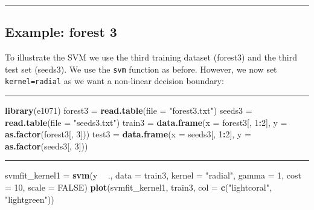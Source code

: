 \documentclass[]{article}
\newenvironment{Shaded}{\begin{snugshade}}{\end{snugshade}}
\newcommand{\DataTypeTok}[1]{\textcolor[rgb]{0.13,0.29,0.53}{#1}}
\newcommand{\DecValTok}[1]{\textcolor[rgb]{0.00,0.00,0.81}{#1}}
\newcommand{\KeywordTok}[1]{\textcolor[rgb]{0.13,0.29,0.53}{\textbf{#1}}}
\newcommand{\NormalTok}[1]{#1}
\newcommand{\OperatorTok}[1]{\textcolor[rgb]{0.81,0.36,0.00}{\textbf{#1}}}
\newcommand{\OtherTok}[1]{\textcolor[rgb]{0.56,0.35,0.01}{#1}}
\newcommand{\StringTok}[1]{\textcolor[rgb]{0.31,0.60,0.02}{#1}}
\begin{document}
\begin{center}\rule{0.5\linewidth}{\linethickness}\end{center}

\hypertarget{example-forest-3}{%
\subsection{Example: forest 3}\label{example-forest-3}}

To illustrate the SVM we use the third training dataset (forest3) and
the third test set (seeds3). We use the \texttt{svm} function as before.
However, we now set
\texttt{kernel=\textquotesingle{}radial\textquotesingle{}} as we want a
non-linear decision boundary:

\begin{center}\rule{0.5\linewidth}{\linethickness}\end{center}

\footnotesize

\begin{Shaded}
\begin{Highlighting}[]
\KeywordTok{library}\NormalTok{(e1071)}
\NormalTok{forest3 =}\StringTok{ }\KeywordTok{read.table}\NormalTok{(}\DataTypeTok{file =} \StringTok{"forest3.txt"}\NormalTok{)}
\NormalTok{seeds3 =}\StringTok{ }\KeywordTok{read.table}\NormalTok{(}\DataTypeTok{file =} \StringTok{"seeds3.txt"}\NormalTok{)}
\NormalTok{train3 =}\StringTok{ }\KeywordTok{data.frame}\NormalTok{(}\DataTypeTok{x =}\NormalTok{ forest3[, }\DecValTok{1}\OperatorTok{:}\DecValTok{2}\NormalTok{], }\DataTypeTok{y =} \KeywordTok{as.factor}\NormalTok{(forest3[, }\DecValTok{3}\NormalTok{]))}
\NormalTok{test3 =}\StringTok{ }\KeywordTok{data.frame}\NormalTok{(}\DataTypeTok{x =}\NormalTok{ seeds3[, }\DecValTok{1}\OperatorTok{:}\DecValTok{2}\NormalTok{], }\DataTypeTok{y =} \KeywordTok{as.factor}\NormalTok{(seeds3[, }\DecValTok{3}\NormalTok{]))}
\end{Highlighting}
\end{Shaded}

\begin{center}\rule{0.5\linewidth}{\linethickness}\end{center}

\begin{Shaded}
\begin{Highlighting}[]
\NormalTok{svmfit_kernel1 =}\StringTok{ }\KeywordTok{svm}\NormalTok{(y }\OperatorTok{~}\StringTok{ }\NormalTok{., }\DataTypeTok{data =}\NormalTok{ train3, }\DataTypeTok{kernel =} \StringTok{"radial"}\NormalTok{, }\DataTypeTok{gamma =} \DecValTok{1}\NormalTok{, }
    \DataTypeTok{cost =} \DecValTok{10}\NormalTok{, }\DataTypeTok{scale =} \OtherTok{FALSE}\NormalTok{)}
\KeywordTok{plot}\NormalTok{(svmfit_kernel1, train3, }\DataTypeTok{col =} \KeywordTok{c}\NormalTok{(}\StringTok{"lightcoral"}\NormalTok{, }\StringTok{"lightgreen"}\NormalTok{))}
\end{Highlighting}
\end{Shaded}
\end{document}
